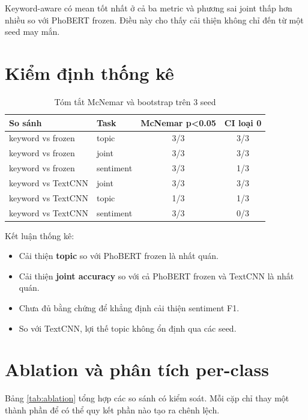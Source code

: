 \documentclass[12pt,a4paper]{report}
\begin{document}
Keyword-aware có mean tốt nhất ở cả ba metric và phương sai joint thấp hơn nhiều so với PhoBERT frozen. Điều này cho thấy cải thiện không chỉ đến từ một seed may mắn.

\section{Kiểm định thống kê}

\begin{table}[H]
\centering
\caption{Tóm tắt McNemar và bootstrap trên 3 seed}
\begin{tabular}{@{}llcc@{}}
\toprule
\textbf{So sánh} & \textbf{Task} & \textbf{McNemar p<0.05} & \textbf{CI loại 0} \\
\midrule
keyword vs frozen & topic & 3/3 & 3/3 \\
keyword vs frozen & joint & 3/3 & 3/3 \\
keyword vs frozen & sentiment & 3/3 & 1/3 \\
keyword vs TextCNN & joint & 3/3 & 3/3 \\
keyword vs TextCNN & topic & 1/3 & 1/3 \\
keyword vs TextCNN & sentiment & 3/3 & 0/3 \\
\bottomrule
\end{tabular}
\end{table}

Kết luận thống kê:

\begin{itemize}[leftmargin=1.2cm]
  \item Cải thiện \textbf{topic} so với PhoBERT frozen là nhất quán.
  \item Cải thiện \textbf{joint accuracy} so với cả PhoBERT frozen và TextCNN là nhất quán.
  \item Chưa đủ bằng chứng để khẳng định cải thiện sentiment F1.
  \item So với TextCNN, lợi thế topic không ổn định qua các seed.
\end{itemize}

\section{Ablation và phân tích per-class}

Bảng \ref{tab:ablation} tổng hợp các so sánh có kiểm soát. Mỗi cặp chỉ thay một thành phần để có thể quy kết phần nào tạo ra chênh lệch.
\end{document}
